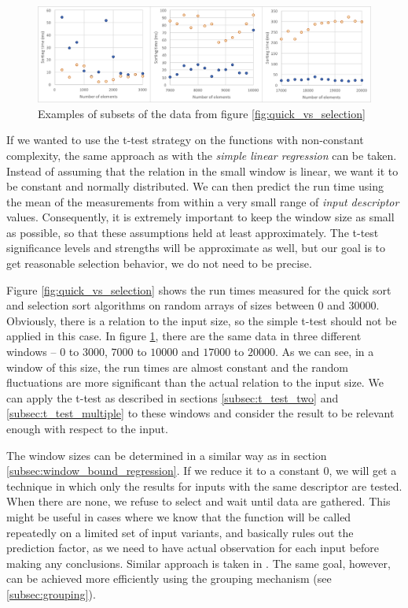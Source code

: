 \begin{figure}[h!]
	\captionsetup{justification=centering,margin=0.5cm}
	\centerline{\mbox{\includegraphics[width=150mm]{./img/window_t_test_examples.png}}}
	\caption{Examples of subsets of the data from figure \ref{fig:quick_vs_selection}}
	\label{fig:window_t_test_examples}
\end{figure}

If we wanted to use the t-test strategy on the functions with non-constant complexity, the same approach as with the \textit{simple linear regression} can be taken. Instead of assuming that the relation in the small window is linear, we want it to be constant and normally distributed. We can then predict the run time using the mean of the measurements from within a very small range of \textit{input descriptor} values. Consequently, it is extremely important to keep the window size as small as possible, so that these assumptions held at least approximately. The t-test significance levels and strengths will be approximate as well, but our goal is to get reasonable selection behavior, we do not need to be precise.

Figure \ref{fig:quick_vs_selection} shows the run times measured for the quick sort and selection sort algorithms on random arrays of sizes between $0$ and $30000$. Obviously, there is a relation to the input size, so the simple t-test should not be applied in this case. In figure \ref{fig:window_t_test_examples}, there are the same data in three different windows -- $0$ to $3000$, $7000$ to $10000$ and $17000$ to $20000$. As we can see, in a window of this size, the run times are almost constant and the random fluctuations are more significant than the actual relation to the input size. We can apply the t-test as described in sections \ref{subsec:t_test_two} and \ref{subsec:t_test_multiple} to these windows and consider the result to be relevant enough with respect to the input.

The window sizes can be determined in a similar way as in section \ref{subsec:window_bound_regression}. If we reduce it to a constant 0, we will get a technique in which only the results for inputs with the same descriptor are tested. When there are none, we refuse to select and wait until data are gathered. This might be useful in cases where we know that the function will be called repeatedly on a limited set of input variants, and basically rules out the prediction factor, as we need to have actual observation for each input before making any conclusions. Similar approach is taken in \cite{bulej_performance_2012}. The same goal, however, can be achieved more efficiently using the grouping mechanism (see \ref{subsec:grouping}).

